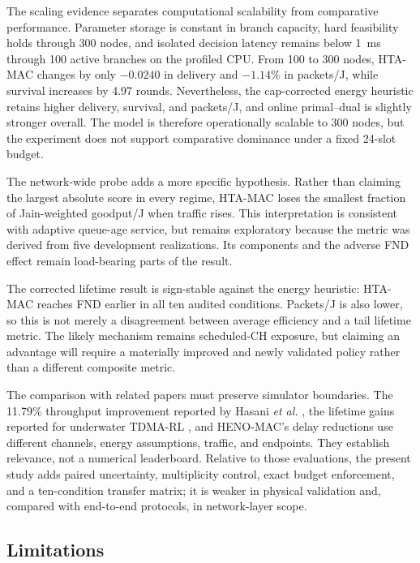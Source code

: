 \documentclass[journal]{IEEEtran}
\newcommand{\method}{HTA-MAC}
\begin{document}
The scaling evidence separates computational scalability from comparative
performance. Parameter storage is constant in branch capacity, hard feasibility
holds through 300 nodes, and isolated decision latency remains below 1~ms
through 100 active branches on the profiled CPU. From 100 to 300 nodes,
\method{} changes by only $-0.0240$ in delivery and $-1.14\%$ in packets/J,
while survival increases by 4.97 rounds. Nevertheless, the cap-corrected energy
heuristic retains higher delivery, survival, and packets/J, and online
primal--dual is slightly stronger overall. The model is therefore operationally
scalable to 300 nodes, but the experiment does not support comparative
dominance under a fixed 24-slot budget.

The network-wide probe adds a more specific hypothesis. Rather than claiming
the largest absolute score in every regime, \method{} loses the smallest
fraction of Jain-weighted goodput/J when traffic rises. This interpretation is
consistent with adaptive queue-age service, but remains exploratory because
the metric was derived from five development realizations. Its components and
the adverse FND effect remain load-bearing parts of the result.

The corrected lifetime result is sign-stable against the energy heuristic:
\method{} reaches FND earlier in all ten audited conditions. Packets/J is also
lower, so this is not merely a disagreement between average efficiency and a
tail lifetime metric. The likely mechanism remains scheduled-CH exposure, but
claiming an advantage will require a materially improved and newly validated
policy rather than a different composite metric.

The comparison with related papers must preserve simulator boundaries. The
11.79\% throughput improvement reported by Hasani \emph{et al.}
\cite{hasani2025drl}, the lifetime gains reported for underwater TDMA-RL
\cite{eris2024underwaterrl}, and HENO-MAC's delay reductions
\cite{sarang2024henomac} use different channels, energy assumptions, traffic,
and endpoints. They establish relevance, not a numerical leaderboard. Relative
to those evaluations, the present study adds paired uncertainty, multiplicity
control, exact budget enforcement, and a ten-condition transfer matrix; it is
weaker in physical validation and, compared with end-to-end protocols, in
network-layer scope.

\subsection{Limitations}
\end{document}
